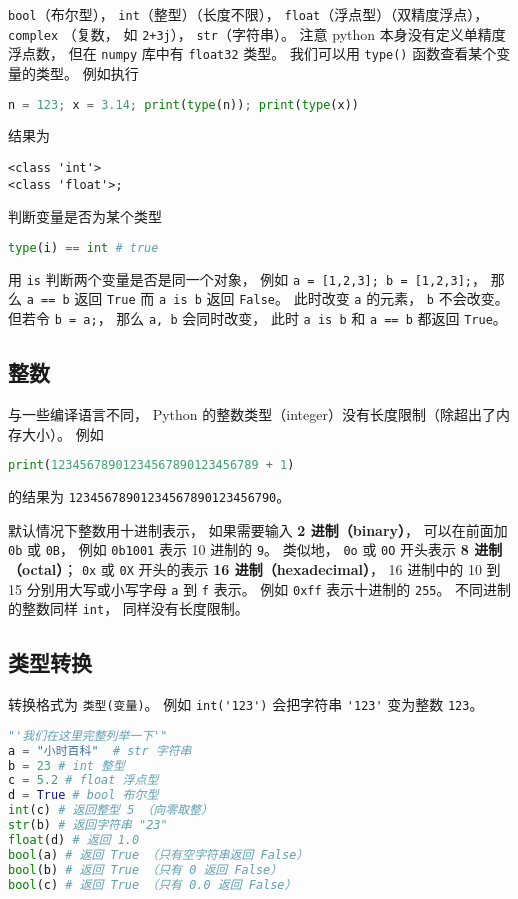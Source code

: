 \verb`bool`（布尔型）， \verb`int`（整型）（长度不限）， \verb`float`（浮点型）（双精度浮点）， \verb`complex` （复数， 如 \verb`2+3j`）， \verb`str`（字符串）。 注意 python 本身没有定义单精度浮点数， 但在 \verb`numpy` 库中有 \verb`float32` 类型。 我们可以用 \verb`type()` 函数查看某个变量的类型。 例如执行
\begin{lstlisting}[language=python]
n = 123; x = 3.14; print(type(n)); print(type(x))
\end{lstlisting}
结果为
\begin{lstlisting}[language=none]
<class 'int'>
<class 'float'>;
\end{lstlisting}
判断变量是否为某个类型
\begin{lstlisting}[language=python]
type(i) == int # true
\end{lstlisting}

用 \verb`is` 判断两个变量是否是同一个对象， 例如 \verb`a = [1,2,3]; b = [1,2,3];`， 那么 \verb`a == b` 返回 \verb`True` 而 \verb`a is b` 返回 \verb`False`。 此时改变 \verb`a` 的元素， \verb`b` 不会改变。 但若令 \verb`b = a;`， 那么 \verb`a, b` 会同时改变， 此时 \verb`a is b` 和 \verb`a == b` 都返回 \verb`True`。

\subsection{整数}
与一些编译语言不同， Python 的整数类型（integer）没有长度限制（除超出了内存大小）。 例如
\begin{lstlisting}[language=python]
print(12345678901234567890123456789 + 1)
\end{lstlisting}
的结果为 \verb`12345678901234567890123456790`。

默认情况下整数用十进制表示， 如果需要输入 \textbf{2 进制（binary）}， 可以在前面加 \verb`0b` 或 \verb`0B`， 例如 \verb`0b1001` 表示 10 进制的 \verb`9`。 类似地， \verb`0o` 或 \verb`0O` 开头表示 \textbf{8 进制（octal）}； \verb`0x` 或 \verb`0X` 开头的表示 \textbf{16 进制（hexadecimal）}， 16 进制中的 10 到 15 分别用大写或小写字母 \verb`a` 到 \verb`f` 表示。 例如 \verb`0xff` 表示十进制的 \verb`255`。 不同进制的整数同样 \verb`int`， 同样没有长度限制。

\subsection{类型转换}
转换格式为 \verb`类型(变量)`。 例如 \verb`int('123')` 会把字符串 \verb`'123'` 变为整数 \verb`123`。
\begin{lstlisting}[language=python]
"'我们在这里完整列举一下'"
a = "小时百科"  # str 字符串
b = 23 # int 整型
c = 5.2 # float 浮点型
d = True # bool 布尔型
int(c) # 返回整型 5 （向零取整）
str(b) # 返回字符串 "23"
float(d) # 返回 1.0
bool(a) # 返回 True （只有空字符串返回 False）
bool(b) # 返回 True （只有 0 返回 False）
bool(c) # 返回 True （只有 0.0 返回 False）
\end{lstlisting}

